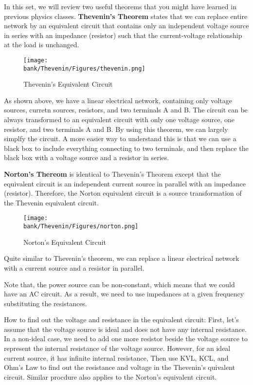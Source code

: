 

In this set, we will review two useful theorems that you might have learned in previous physics classes.
\textbf{Thevenin's Theorem} states that we can replace entire network by an equivalent circuit that contains only
an independent voltage source in series with an impedance (resistor) such that the current-voltage 
relationship at the load is unchanged.
\begin{figure}[H]
  \centering
  \texttt{[image: \\bank/Thevenin/Figures/thevenin.png]}
  \caption{Thevenin's Equivalent Circuit}
  \label{A Thevenin Equivalent Circuit Example}
\end{figure}
As shown above, we have a linear electrical network, containing only voltage sources, curretn sources, resistors, and
two terminals A and B. The circuit can be always transformed to an equivalent circuit with only one voltage source, one resistor,
and two terminals A and B. By using this theorem, we can largely simplfy the circuit. A more easier way to understand this is that
we can use a black box to include everything connecting to two terminals, and then replace the black box with a voltage source and 
a resistor in series. 

\textbf{Norton's Thereom} is identical to Thevenin's Theorem except that the equivalent circuit is an
independent current source in parallel with an impedance (resistor). Therefore, the Norton equivalent circuit 
is a source transformation of the Thevenin equivalent circuit.
\begin{figure}[H]
  \centering
  \texttt{[image: \\bank/Thevenin/Figures/norton.png]}
  \caption{Norton's Equivalent Circuit}
  \label{A Norton Equivalent Circuit Example}
\end{figure}
Quite similar to Thevenin's theorem, we can replace a linear electrical network with a current source and a resistor in parallel.

Note that, the power source can be non-constant, which means that we could have an AC circuit. As a result, we need to use
impedances at a given frequency substituting the resistances.

How to find out the voltage and resistance in the equivalent circuit:
First, let's assume that the voltage source is ideal and does not have any internal resistance. In a non-ideal case, we need 
to add one more resistor beside the voltage source to represent the internal resistance of the voltage source. However, for an ideal 
current source, it has infinite internal resistance, 
Then use KVL, KCL, and Ohm's Law to find out the resistance and voltage in the Thevenin's quivalent circuit. Similar procdure
also applies to the Norton's equivalent circuit.

